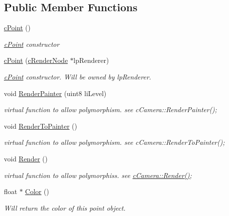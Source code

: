 \subsection*{Public Member Functions}
\begin{DoxyCompactItemize}
\item 
\hyperlink{classc_point_a2a1ced307ad76494d92cc2f7a97cf747}{cPoint} ()
\begin{DoxyCompactList}\small\item\em \hyperlink{classc_point}{cPoint} constructor \item\end{DoxyCompactList}\item 
\hyperlink{classc_point_ac5ecbbafc3d716abec2d9629a7b59f08}{cPoint} (\hyperlink{classc_render_node}{cRenderNode} $\ast$lpRenderer)
\begin{DoxyCompactList}\small\item\em \hyperlink{classc_point}{cPoint} constructor. Will be owned by lpRenderer. \item\end{DoxyCompactList}\item 
void \hyperlink{classc_point_a51b99266661d1cf35c04d6e93b681ade}{RenderPainter} (uint8 liLevel)
\begin{DoxyCompactList}\small\item\em virtual function to allow polymorphism. see cCamera::RenderPainter(); \item\end{DoxyCompactList}\item 
void \hyperlink{classc_point_a67e471d5f9c67ede9e3357910eda4dc5}{RenderToPainter} ()
\begin{DoxyCompactList}\small\item\em virtual function to allow polymorphism. see cCamera::RenderToPainter(); \item\end{DoxyCompactList}\item 
void \hyperlink{classc_point_a695f51244ffde2e5d4d932ccbde443c7}{Render} ()
\begin{DoxyCompactList}\small\item\em virtual function to allow polymorphiss. see \hyperlink{classc_camera_acfe96d0953540fa3938e4d415d7cb791}{cCamera::Render()}; \item\end{DoxyCompactList}\item 
float $\ast$ \hyperlink{classc_point_abc98333d99e69787ecf46e642d4dce48}{Color} ()
\begin{DoxyCompactList}\small\item\em Will return the color of this point object. \item\end{DoxyCompactList}\item 

\end{DoxyCompactItemize}
